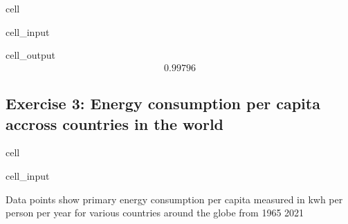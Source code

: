 \documentclass[letterpaper,10pt,english]{jupyterBook}
\begin{document}
\begin{sphinxuseclass}{cell}\begin{sphinxVerbatimInput}

\begin{sphinxuseclass}{cell_input}
\begin{sphinxVerbatim}[commandchars=\\\{\}]
\end{sphinxVerbatim}

\end{sphinxuseclass}\end{sphinxVerbatimInput}
\begin{sphinxVerbatimOutput}

\begin{sphinxuseclass}{cell_output}\begin{equation*}
\begin{split}0.99796\end{split}
\end{equation*}
\end{sphinxuseclass}\end{sphinxVerbatimOutput}

\end{sphinxuseclass}

\subsection{Exercise 3: Energy consumption per capita accross countries in the world}
\label{\detokenize{exercises_unit_2:exercise-3-energy-consumption-per-capita-accross-countries-in-the-world}}
\begin{sphinxuseclass}{cell}\begin{sphinxVerbatimInput}

\begin{sphinxuseclass}{cell_input}
\begin{sphinxVerbatim}[commandchars=\\\{\}]
\end{sphinxVerbatim}

\end{sphinxuseclass}\end{sphinxVerbatimInput}

\end{sphinxuseclass}
\sphinxAtStartPar
Data points show primary energy consumption per capita measured in kwh per person per year for various countries around the globe from 1965 \sphinxhyphen{} 2021
\end{document}
